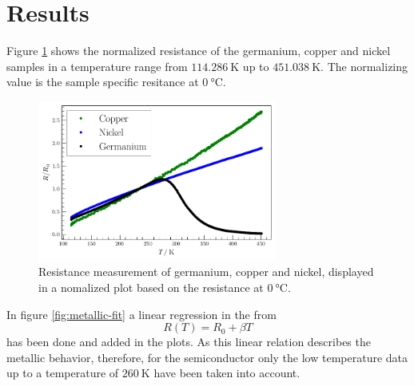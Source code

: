 
\section{Results}
\label{sec:Results}

Figure \ref{fig:comparison} shows the normalized resistance of the germanium, copper and nickel samples in a temperature range from $\SI{114.286}{\kelvin}$ up to $\SI{451.038}{\kelvin}$.
The normalizing value is the sample specific resitance at $\SI{0}{\celsius}$.

\begin{figure}
    \centering
    \captionsetup{width=0.9\linewidth}
    \includegraphics[width=0.7\textwidth]{plots/compare.pdf}
  \caption{Resistance measurement of germanium, copper and nickel, displayed in a nomalized plot based on the resistance at $\SI{0}{\celsius}$.}
    \label{fig:comparison}
\end{figure}

In figure \ref{fig:metallic-fit} a linear regression in the from
\begin{equation}
    R(T) = R_0 +\beta T
\end{equation}\label{equ:metalic-fit}
has been done and added in the plots. 
As this linear relation describes the metallic behavior, therefore, for the semiconductor only the low temperature data up to a temperature of $\SI{260}{\kelvin}$ have been taken into account.

